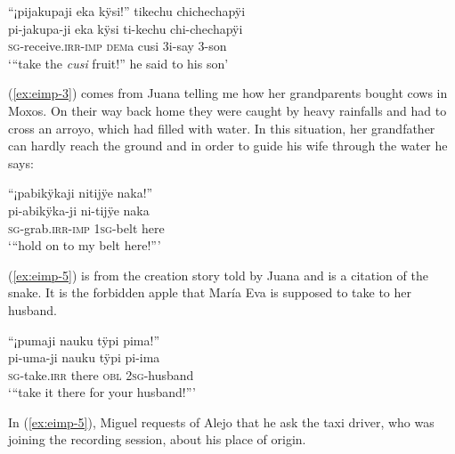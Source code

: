 \ea\label{ex:eimp-2}
\begingl
\glpreamble “¡pijakupaji eka kÿsi!” tikechu chichechapÿi\\
\gla pi-jakupa-ji eka kÿsi ti-kechu chi-chechapÿi\\
\textsc{sg}-receive.\textsc{irr}-\textsc{imp} \textsc{dem}a cusi 3i-say 3-son\\
\glft ‘“take the \textit{cusi} fruit!” he said to his son’
\endgl
\trailingcitation{[mox-n110920l.100]}
\xe

(\ref{ex:eimp-3}) comes from Juana telling me how her grandparents bought cows in Moxos. On their way back home they were caught by heavy rainfalls and had to cross an arroyo, which had filled with water. In this situation, her grandfather can hardly reach the ground and in order to guide his wife through the water he says:

\ea\label{ex:eimp-3}
\begingl
\glpreamble “¡pabikÿkaji nitijÿe naka!”\\
\gla pi-abikÿka-ji ni-tijÿe naka\\
\textsc{sg}-grab.\textsc{irr}-\textsc{imp} 1\textsc{sg}-belt here\\
\glft ‘“hold on to my belt here!”'
\endgl
\trailingcitation{[jxx-p151016l-2.141]}
\xe


(\ref{ex:eimp-5}) is from the creation story told by Juana and is a citation of the snake. It is the forbidden apple that María Eva is supposed to take to her husband.

\ea\label{ex:eimp-4}
\begingl
\glpreamble “¡pumaji nauku tÿpi pima!”\\
\gla pi-uma-ji nauku tÿpi pi-ima\\
\textsc{sg}-take.\textsc{irr} there \textsc{obl} 2\textsc{sg}-husband\\
\glft ‘“take it there for your husband!”’
\endgl
\trailingcitation{[jxx-n101013s-1.413]}
\xe

In (\ref{ex:eimp-5}), Miguel requests of Alejo that he ask the taxi driver, who was joining the recording session, about his place of origin.

